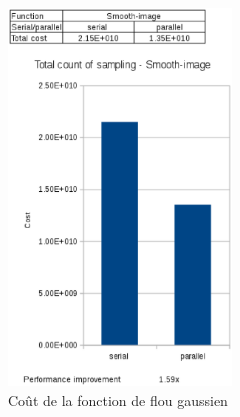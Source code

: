 \documentclass[10pt]{report}
\begin{document}
		
		\begin{figure}
			\includegraphics[height=10cm]{Reports/figures/smooth_image_costs.eps}
			\caption{Coût de la fonction de flou gaussien}
			\label{Coût de la fonction de flou gaussien}
		\end{figure}
\end{document}
